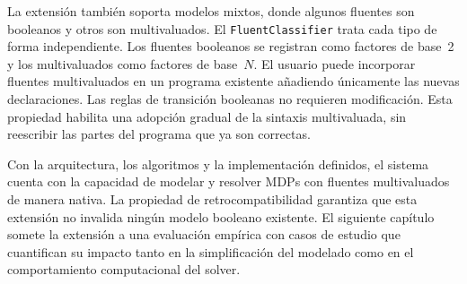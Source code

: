 La extensión también soporta modelos mixtos, donde algunos fluentes son booleanos y
otros son multivaluados. El \texttt{FluentClassifier} trata cada tipo de forma
independiente. Los fluentes booleanos se registran como factores de base~2 y los
multivaluados como factores de base~$N$. El usuario puede incorporar fluentes
multivaluados en un programa existente añadiendo únicamente las nuevas declaraciones.
Las reglas de transición booleanas no requieren modificación. Esta propiedad habilita una adopción gradual de la sintaxis multivaluada, sin
reescribir las partes del programa que ya son correctas.

Con la arquitectura, los algoritmos y la implementación definidos, el sistema cuenta
con la capacidad de modelar y resolver MDPs con fluentes multivaluados de manera
nativa. La propiedad de retrocompatibilidad garantiza que esta extensión no invalida
ningún modelo booleano existente. El siguiente capítulo somete la extensión a una
evaluación empírica con casos de estudio que cuantifican su impacto tanto en
la simplificación del modelado como en el comportamiento computacional del solver.
